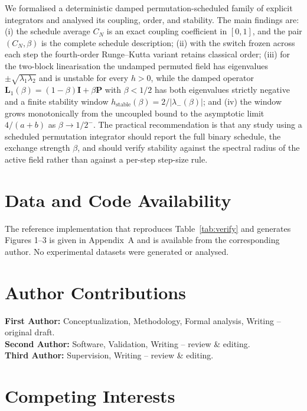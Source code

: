 \documentclass[12pt, a4paper]{article}
\theoremstyle{plain}
\theoremstyle{definition}
\theoremstyle{remark}
\newcommand{\bI}{\mathbf{I}}
\newcommand{\bP}{\mathbf{P}}
\newcommand{\bL}{\mathbf{L}}
\begin{document}
We formalised a deterministic damped permutation-scheduled family of explicit
integrators and analysed its coupling, order, and stability. The main findings
are: (i) the schedule average $C_N$ is an exact coupling coefficient in
$[0,1]$, and the pair $(C_N, \beta)$ is the complete schedule description;
(ii) with the switch frozen across each step the fourth-order Runge--Kutta
variant retains classical order; (iii) for the two-block linearisation the
undamped permuted field has eigenvalues $\pm\sqrt{\lambda_1\lambda_2}$ and is
unstable for every $h>0$, while the damped operator
$\bL_1(\beta) = (1-\beta)\bI + \beta\bP$ with $\beta < 1/2$ has both
eigenvalues strictly negative and a finite stability window
$h_{\mathrm{stable}}(\beta) = 2/|\lambda_-(\beta)|$; and (iv) the window grows
monotonically from the uncoupled bound to the asymptotic limit $4/(a+b)$ as
$\beta \to 1/2^-$. The practical recommendation is that any study using a
scheduled permutation integrator should report the full binary schedule, the
exchange strength $\beta$, and should verify stability against the spectral
radius of the active field rather than against a per-step step-size rule.

\section*{Data and Code Availability}
\label{sec:data}

The reference implementation that reproduces Table~\ref{tab:verify} and
generates Figures 1--3 is given in Appendix~A and is available from the
corresponding author. No experimental datasets were generated or analysed.

\section*{Author Contributions}
\label{sec:contributions}

\textbf{First Author:} Conceptualization, Methodology, Formal analysis,
Writing -- original draft. \\
\textbf{Second Author:} Software, Validation, Writing -- review \& editing. \\
\textbf{Third Author:} Supervision, Writing -- review \& editing.

\section*{Competing Interests}
\label{sec:competing}
\end{document}
